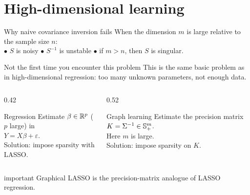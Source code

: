 \documentclass[dvipsnames,aspectratio=169,handout]{beamer}
\begin{document}

\section{High-dimensional learning}

\begin{frame}{Why naive covariance inversion fails}
When the dimension $m$ is large relative to the sample size $n$:\\[2mm]
\qquad $\bullet$ $S$ is noisy\qquad 
    $\bullet$ $S^{-1}$ is unstable\qquad 
    $\bullet$ if $m>n$, then $S$ is singular.

\begin{alertblock}{Not the first time you encounter this problem}
This is the same basic problem as in high-dimensional regression:
too many unknown parameters, not enough data.
\end{alertblock}

\begin{columns}[T]
\begin{column}{0.42\textwidth}
\begin{block}{Regression}
Estimate $\beta\in \R^p$ ($p$ large) in\\[2mm]
\qquad $
Y=X\beta+\varepsilon.
$\\[2mm]
Solution: impose sparsity with LASSO.
\end{block}
\end{column}

\begin{column}{0.52\textwidth}
\begin{block}{Graph learning}
Estimate the precision matrix $K=\Sigma^{-1}\in \S^m_+$.\\[2mm]
Here $m$ is large.\\[2mm]
Solution: impose sparsity on  $K$.
\end{block}
\end{column}
\end{columns}

\vspace{1mm}
\begin{beamercolorbox}[wd=\textwidth,sep=7pt,center,rounded=true,shadow=true]{important}
Graphical LASSO is the precision-matrix analogue of LASSO regression.
\end{beamercolorbox}
\end{frame}
\end{document}
